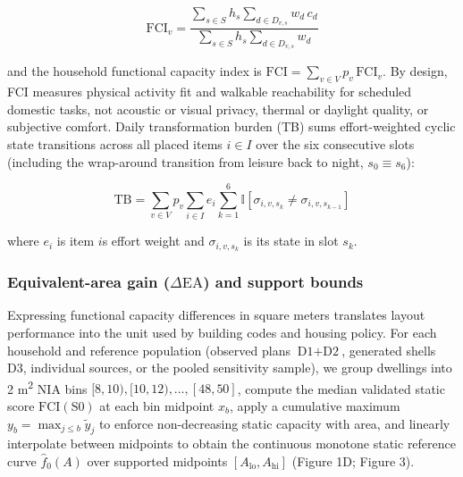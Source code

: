 \documentclass[12pt,letterpaper]{article}
\begin{document}
\[\text{FCI}_v = \frac{\sum_{s \in S} h_s \sum_{d \in D_{v,s}} w_d \, c_d}{\sum_{s \in S} h_s \sum_{d \in D_{v,s}} w_d}\]

and the household functional capacity index is \(\text{FCI} = \sum_{v \in V} p_v \, \text{FCI}_v\). By design, FCI measures physical activity fit and walkable reachability for scheduled domestic tasks, not acoustic or visual privacy, thermal or daylight quality, or subjective comfort. Daily transformation burden (TB) sums effort-weighted cyclic state transitions across all placed items \(i \in I\) over the six consecutive slots (including the wrap-around transition from leisure back to night, \(s_0 \equiv s_6\)):

\[\text{TB} = \sum_{v \in V} p_v \sum_{i \in I} e_i \sum_{k=1}^{6} \mathbb{I}\!\left[\sigma_{i,v,s_k} \neq \sigma_{i,v,s_{k-1}}\right]\]

where \(e_i\) is item \(i\)\textquotesingle s effort weight and \(\sigma_{i,v,s_k}\) is its state in slot \(s_k\).

\subsubsection{\texorpdfstring{Equivalent-area gain (\(\Delta\text{EA}\)) and support bounds}{Equivalent-area gain (\textbackslash Delta\textbackslash text\{EA\}) and support bounds}}\label{equivalent-area-gain-deltatextea-and-support-bounds}

Expressing functional capacity differences in square meters translates layout performance into the unit used by building codes and housing policy. For each household and reference population (observed plans \(\text{D1}+\text{D2}\), generated shells D3, individual sources, or the pooled sensitivity sample), we group dwellings into 2 m\textsuperscript{2} NIA bins \([8, 10), [10, 12), \dots, [48, 50]\), compute the median validated static score \(\text{FCI}(\text{S0})\) at each bin midpoint \(x_b\), apply a cumulative maximum \(y_b = \max_{j \le b} \tilde{y}_j\) to enforce non-decreasing static capacity with area, and linearly interpolate between midpoints to obtain the continuous monotone static reference curve \(\hat{f}_0(A)\) over supported midpoints \([A_{\text{lo}}, A_{\text{hi}}]\) (Figure 1D; Figure 3).
\end{document}
